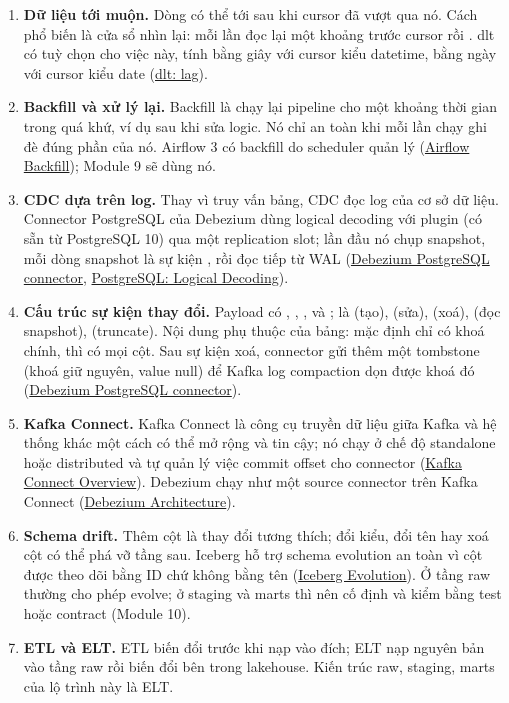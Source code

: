 \begin{enumerate}
  \item \textbf{Dữ liệu tới muộn.} Dòng có thể tới sau khi cursor đã vượt qua nó. Cách phổ biến là cửa sổ nhìn lại: mỗi lần đọc lại một khoảng trước cursor rồi . dlt có tuỳ chọn  cho việc này, tính bằng giây với cursor kiểu datetime, bằng ngày với cursor kiểu date (\href{https://dlthub.com/docs/general-usage/incremental/lag}{dlt: lag}).
  \item \textbf{Backfill và xử lý lại.} Backfill là chạy lại pipeline cho một khoảng thời gian trong quá khứ, ví dụ sau khi sửa logic. Nó chỉ an toàn khi mỗi lần chạy ghi đè đúng phần của nó. Airflow 3 có backfill do scheduler quản lý (\href{https://airflow.apache.org/docs/apache-airflow/stable/core-concepts/backfill.html}{Airflow Backfill}); Module 9 sẽ dùng nó.
  \item \textbf{CDC dựa trên log.} Thay vì truy vấn bảng, CDC đọc log của cơ sở dữ liệu. Connector PostgreSQL của Debezium dùng logical decoding với plugin  (có sẵn từ PostgreSQL 10) qua một replication slot; lần đầu nó chụp snapshot, mỗi dòng snapshot là sự kiện , rồi đọc tiếp từ WAL (\href{https://debezium.io/documentation/reference/stable/connectors/postgresql.html}{Debezium PostgreSQL connector}, \href{https://www.postgresql.org/docs/18/logicaldecoding.html}{PostgreSQL: Logical Decoding}).
  \item \textbf{Cấu trúc sự kiện thay đổi.} Payload có , , ,  và ;  là  (tạo),  (sửa),  (xoá),  (đọc snapshot),  (truncate). Nội dung  phụ thuộc  của bảng: mặc định chỉ có khoá chính,  thì có mọi cột. Sau sự kiện xoá, connector gửi thêm một tombstone (khoá giữ nguyên, value null) để Kafka log compaction dọn được khoá đó (\href{https://debezium.io/documentation/reference/stable/connectors/postgresql.html}{Debezium PostgreSQL connector}).
  \item \textbf{Kafka Connect.} Kafka Connect là công cụ truyền dữ liệu giữa Kafka và hệ thống khác một cách có thể mở rộng và tin cậy; nó chạy ở chế độ standalone hoặc distributed và tự quản lý việc commit offset cho connector (\href{https://kafka.apache.org/44/kafka-connect/overview/}{Kafka Connect Overview}). Debezium chạy như một source connector trên Kafka Connect (\href{https://debezium.io/documentation/reference/stable/architecture.html}{Debezium Architecture}).
  \item \textbf{Schema drift.} Thêm cột là thay đổi tương thích; đổi kiểu, đổi tên hay xoá cột có thể phá vỡ tầng sau. Iceberg hỗ trợ schema evolution an toàn vì cột được theo dõi bằng ID chứ không bằng tên (\href{https://iceberg.apache.org/docs/latest/evolution/}{Iceberg Evolution}). Ở tầng raw thường cho phép evolve; ở staging và marts thì nên cố định và kiểm bằng test hoặc contract (Module 10).
  \item \textbf{ETL và ELT.} ETL biến đổi trước khi nạp vào đích; ELT nạp nguyên bản vào tầng raw rồi biến đổi bên trong lakehouse. Kiến trúc raw, staging, marts của lộ trình này là ELT.
\end{enumerate}

